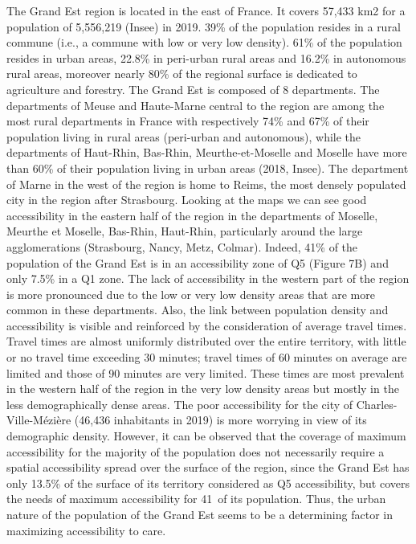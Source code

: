The Grand Est region is located in the east of France. It covers 57,433 km2 for a population of 5,556,219 (Insee) in 2019. 39\% of the population resides in a rural commune (i.e., a commune with low or very low density). 61\% of the population resides in urban areas, 22.8\% in peri-urban rural areas and 16.2\% in autonomous rural areas, moreover nearly 80\% of the regional surface is dedicated to agriculture and forestry.
The Grand Est is composed of 8 departments. The departments of Meuse and Haute-Marne central to the region are among the most rural departments in France with respectively 74\% and 67\% of their population living in rural areas (peri-urban and autonomous), while the departments of Haut-Rhin, Bas-Rhin, Meurthe-et-Moselle and Moselle have more than 60\% of their population living in urban areas (2018, Insee). The department of Marne in the west of the region is home to Reims, the most densely populated city in the region after Strasbourg. Looking at the maps we can see good accessibility in the eastern half of the region in the departments of Moselle, Meurthe et Moselle, Bas-Rhin, Haut-Rhin, particularly around the large agglomerations (Strasbourg, Nancy, Metz, Colmar). Indeed, 41\% of the population of the Grand Est is in an accessibility zone of Q5 (Figure 7B) and only 7.5\% in a Q1 zone. The lack of accessibility in the western part of the region is more pronounced due to the low or very low density areas that are more common in these departments. Also, the link between population density and accessibility is visible and reinforced by the consideration of average travel times. Travel times are almost uniformly distributed over the entire territory, with little or no travel time exceeding 30 minutes; travel times of 60 minutes on average are limited and those of 90 minutes are very limited. These times are most prevalent in the western half of the region in the very low density areas but mostly in the less demographically dense areas.  The poor accessibility for the city of Charles-Ville-Mézière (46,436 inhabitants in 2019) is more worrying in view of its demographic density.
However, it can be observed that the coverage of maximum accessibility for the majority of the population does not necessarily require a spatial accessibility spread over the surface of the region, since the Grand Est has only 13.5\% of the surface of its territory considered as Q5 accessibility, but covers the needs of maximum accessibility for 41\ of its population. Thus, the urban nature of the population of the Grand Est seems to be a determining factor in maximizing accessibility to care.

